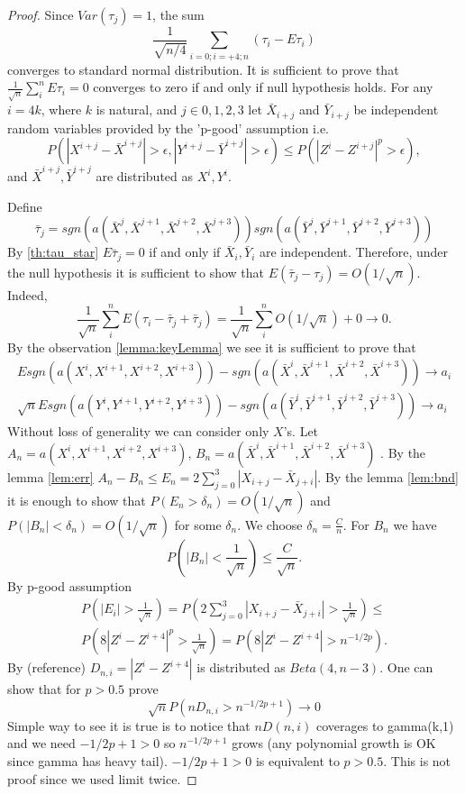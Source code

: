 \documentclass{article}
\begin{document}
\begin{proof}
Since $Var(\tau_j)=1$, the sum 
\[
 \frac{1}{\sqrt {n/4}} \sum_{i=0;i=+4;n} (\tau_i - E \tau_i)   
\]
converges to standard  normal distribution. It is sufficient to prove that $\frac{1} {\sqrt n} \sum_{i}^{n} E \tau_i=0$ converges to zero if and only if  null hypothesis holds. For any  $i=4k$, where $k$ is natural, and $j \in {0,1,2,3}$ let $\bar X_{i+j}$ and $\bar Y_{i+j}$ be independent random variables provided by the 'p-good' assumption i.e. 
\[
 P( |X^{i+j}- \bar X^{i+j}|>\epsilon,|Y^{i+j}- \bar Y^{i+j}|>\epsilon  ) \leq P(|Z^i-Z^{i+j}|^p>\epsilon),
\]
and $\bar X^{i+j},\bar Y^{i+j}$ are distributed as $X^i,Y^i$. 

Define 
\[
 \bar \tau_j = sgn(a(\bar X^{j},\bar X^{j+1},\bar X^{j+2}, \bar X^{j+3})) sgn(a(\bar Y^{j},\bar Y^{j+1},\bar Y^{j+2},\bar Y^{j+3}))
\]
By \ref{th:tau_star} $E \bar \tau_j=0$ if and only if  $\bar X_i , \bar Y_i$ are independent. Therefore, under the null hypothesis it is sufficient to show  that $ E (\bar \tau_j - \tau_j) = O(1/ \sqrt n)$. Indeed, 
\[
 \frac{1} {\sqrt n} \sum_{i}^{n} E (\tau_i - \bar \tau_j +\bar \tau_j) = \frac{1} {\sqrt n} \sum_{i}^{n} O(1/ \sqrt n) +0 \to 0.
\]
By the observation \ref{lemma:keyLemma} we see it is sufficient to prove that  
\begin{align}
   E sgn(a(X^{i},X^{i+1},X^{i+2},X^{i+3})) - sgn(a(\bar X^{i},\bar X^{i+1},\bar X^{i+2}, \bar X^{i+3})) \to a_i  \\
  \sqrt n  E sgn(a(Y^{i},Y^{i+1},Y^{i+2},Y^{i+3})) - sgn(a(\bar Y^{i},\bar Y^{i+1},\bar Y^{i+2}, \bar Y^{i+3})) \to a_i
\end{align}
Without loss of generality we can consider only $X$'s. Let $A_n = a(X^{i},X^{i+1},X^{i+2},X^{i+3})$, $B_n = a(\bar X^{i},\bar X^{i+1},\bar X^{i+2}, \bar X^{i+3})$ . By the lemma \ref{lem:err} $ A_n-B_n \leq E_n = 2 \sum_{j=0}^3 |X_{i+j}-\bar X_{j+i}|$. By the lemma  \ref{lem:bnd} it is enough to show that  $P( E_n > \delta_n ) = O(1/ \sqrt n)$ and $P( |B_n| < \delta_n )=O(1/ \sqrt n)$ for some  $\delta_n$. We choose $\delta_n = \frac{C} {n}$. For $B_n$ we have 
\[
 P( |B_n| < \frac{1}{\sqrt n} ) \leq \frac{C}{\sqrt n}. 
\]
By p-good assumption
\begin{align}
 P(|E_i| > \frac{1}{\sqrt n} ) = P( 2 \sum_{j=0}^3 |X_{i+j}-\bar X_{j+i}| > \frac{1}{\sqrt n} ) \leq \\
 P( 8|Z^i - Z^{i+4}|^p > \frac{1}{\sqrt n} )   =  P(  8|Z^i - Z^{i+4}| > n^{-1/2p} ).
\end{align}
By (reference)  $D_{n,i} = |Z^i - Z^{i+4}|$ is distributed as $Beta(4,n-3)$.  One can show that for $p>0.5$ prove
\[
 \sqrt n P( n D_{n,i} > n^{-1/2p+1}) \to 0 
\]
Simple way to see it is true is to  notice that $n D(n,i)$ coverages to gamma(k,1) and we need $-1/2p+1 >0 $ so $n^{-1/2p+1}$ grows (any polynomial growth is OK since gamma has heavy tail).  $-1/2p+1 >0$ is equivalent to $p>0.5$. This is not proof since we used limit twice.
\end{proof}
\end{document}
